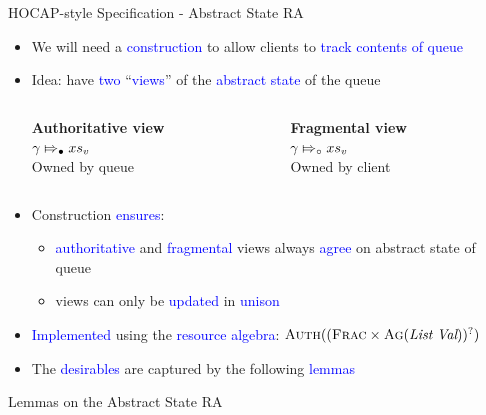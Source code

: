 \documentclass[9pt,xcolor={dvipsnames}]{beamer}
\newcommand{\absvalueList}{xs_v}
\newcommand{\abstractstatefullfrag}[2]{#1 \Mapsto_{\circ} #2}
\newcommand{\abstractstateauth}[2]{#1 \Mapsto_{\bullet} #2}
\begin{document}
\begin{frame}{HOCAP-style Specification - Abstract State RA}
  \begin{itemize}
    \item We will need a \textcolor{blue}{construction} to allow clients to \textcolor{blue}{track contents of queue}
    \item Idea: have \textcolor{blue}{two} ``\textcolor{blue}{views}'' of the \textcolor{blue}{abstract state} of the queue
    \begin{columns}
      \begin{column}{0.5\textwidth}
        \begin{center}
          \textbf{Authoritative view}\\
          $\abstractstateauth{\gname}{\absvalueList}$\\
          Owned by queue\\
        \end{center}
      \end{column}
      \begin{column}{0.5\textwidth}
        \begin{center}
          \textbf{Fragmental view}\\
          $\abstractstatefullfrag{\gname}{\absvalueList}$\\
          Owned by client\\
        \end{center}
      \end{column}
    \end{columns}
    \item Construction \textcolor{blue}{ensures}:
      \begin{itemize}
        \item \textcolor{blue}{authoritative} and \textcolor{blue}{fragmental} views always \textcolor{blue}{agree} on abstract state of queue
        \item views can only be \textcolor{blue}{updated} in \textcolor{blue}{unison}
      \end{itemize}
    \item \textcolor{blue}{Implemented} using the \textcolor{blue}{resource algebra}: $\textsc{Auth}((\textsc{Frac} \times \textsc{Ag}(\textit{List} ~ \textit{Val}))^?)$
      \item The \textcolor{blue}{desirables} are captured by the following \textcolor{blue}{lemmas}
  \end{itemize}
  \begin{block}{Lemmas on the Abstract State RA}

\end{block}
\end{frame}
\end{document}
